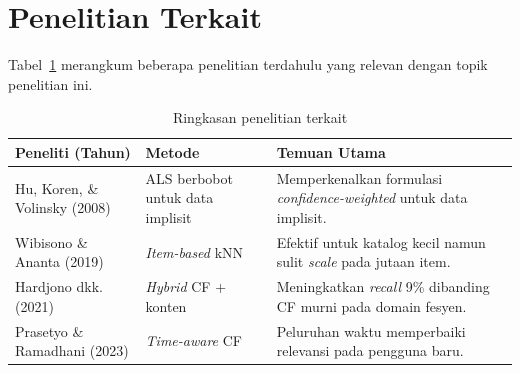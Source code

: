 \section{Penelitian Terkait}
Tabel~\ref{tab:terkait} merangkum beberapa penelitian terdahulu yang
relevan dengan topik penelitian ini.

\begin{table}[htb]
\centering
\caption{Ringkasan penelitian terkait}
\label{tab:terkait}
\begin{tabularx}{\textwidth}{@{}p{3.4cm}p{4.4cm}X@{}}
\toprule
\textbf{Peneliti (Tahun)} & \textbf{Metode} & \textbf{Temuan Utama} \\
\midrule
Hu, Koren, \& Volinsky (2008) & ALS berbobot untuk data implisit &
  Memperkenalkan formulasi \emph{confidence-weighted} untuk data implisit. \\
Wibisono \& Ananta (2019) & \emph{Item-based} kNN &
  Efektif untuk katalog kecil namun sulit \emph{scale} pada jutaan item. \\
Hardjono dkk. (2021) & \emph{Hybrid} CF + konten &
  Meningkatkan \emph{recall} 9\% dibanding CF murni pada domain fesyen. \\
Prasetyo \& Ramadhani (2023) & \emph{Time-aware} CF &
  Peluruhan waktu memperbaiki relevansi pada pengguna baru. \\
\bottomrule
\end{tabularx}
\end{table}
